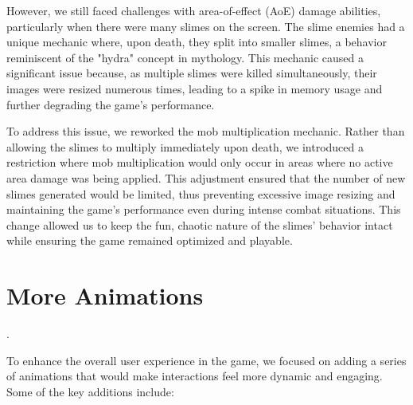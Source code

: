 \documentclass[a4paper,12pt]{article}
\begin{document}
However, we still faced challenges with area-of-effect (AoE) damage abilities, particularly when there were many slimes on the screen. The slime enemies had a unique mechanic where, upon death, they split into smaller slimes, a behavior reminiscent of the "hydra" concept in mythology. This mechanic caused a significant issue because, as multiple slimes were killed simultaneously, their images were resized numerous times, leading to a spike in memory usage and further degrading the game’s performance.

To address this issue, we reworked the mob multiplication mechanic. Rather than allowing the slimes to multiply immediately upon death, we introduced a restriction where mob multiplication would only occur in areas where no active area damage was being applied. This adjustment ensured that the number of new slimes generated would be limited, thus preventing excessive image resizing and maintaining the game’s performance even during intense combat situations. This change allowed us to keep the fun, chaotic nature of the slimes' behavior intact while ensuring the game remained optimized and playable.

\section*{More Animations}
.

To enhance the overall user experience in the game, we focused on adding a series of animations that would make interactions feel more dynamic and engaging. Some of the key additions include:
\end{document}
